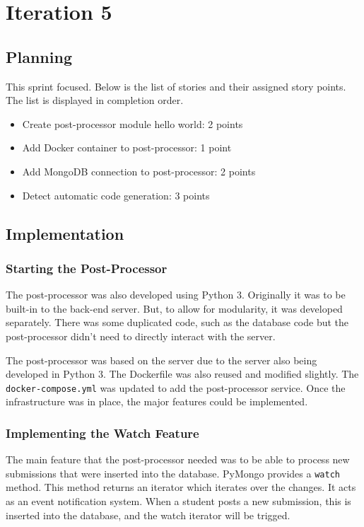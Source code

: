 \chapter{Iteration 5}
\section{Planning}
This sprint focused. Below is the list of stories and their assigned story points. The list is displayed in completion order.

\begin{itemize}
\item Create post-processor module hello world: 2 points
\item Add Docker container to post-processor: 1 point
\item Add MongoDB connection to post-processor: 2 points
\item Detect automatic code generation: 3 points
\end{itemize}

\section{Implementation}
\subsection{Starting the Post-Processor}
The post-processor was also developed using Python 3. Originally it was to be built-in to the back-end server. But, to allow for modularity, it was developed separately. There was some duplicated code, such as the database code but the post-processor didn't need to directly interact with the server.

The post-processor was based on the server due to the server also being developed in Python 3. The Dockerfile was also reused and modified slightly. The \texttt{docker-compose.yml} was updated to add the post-processor service. Once the infrastructure was in place, the major features could be implemented.

\subsection{Implementing the Watch Feature}
The main feature that the post-processor needed was to be able to process new submissions that were inserted into the database. PyMongo provides a \texttt{watch} method. This method returns an iterator which iterates over the changes. It acts as an event notification system. When a student posts a new submission, this is inserted into the database, and the watch iterator will be trigged.

